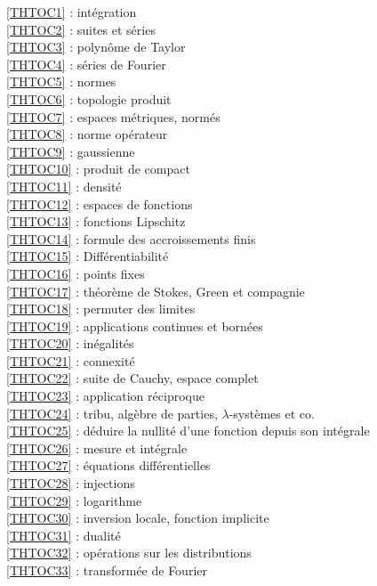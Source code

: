 \ref {THTOC1} : intégration\\
\ref {THTOC2} : suites et séries\\
\ref {THTOC3} : polynôme de Taylor\\
\ref {THTOC4} : séries de Fourier\\
\ref {THTOC5} : normes\\
\ref {THTOC6} : topologie produit\\
\ref {THTOC7} : espaces métriques, normés\\
\ref {THTOC8} : norme opérateur\\
\ref {THTOC9} : gaussienne\\
\ref {THTOC10} : produit de compact\\
\ref {THTOC11} : densité\\
\ref {THTOC12} : espaces de fonctions\\
\ref {THTOC13} : fonctions Lipschitz\\
\ref {THTOC14} : formule des accroissements finis\\
\ref {THTOC15} : Différentiabilité\\
\ref {THTOC16} : points fixes\\
\ref {THTOC17} : théorème de Stokes, Green et compagnie\\
\ref {THTOC18} : permuter des limites\\
\ref {THTOC19} : applications continues et bornées\\
\ref {THTOC20} : inégalités\\
\ref {THTOC21} : connexité\\
\ref {THTOC22} : suite de Cauchy, espace complet\\
\ref {THTOC23} : application réciproque\\
\ref {THTOC24} : tribu, algèbre de parties, \( \lambda \)-systèmes et co.\\
\ref {THTOC25} : déduire la nullité d'une fonction depuis son intégrale\\
\ref {THTOC26} : mesure et intégrale\\
\ref {THTOC27} : équations différentielles\\
\ref {THTOC28} : injections\\
\ref {THTOC29} : logarithme\\
\ref {THTOC30} : inversion locale, fonction implicite\\
\ref {THTOC31} : dualité\\
\ref {THTOC32} : opérations sur les distributions\\
\ref {THTOC33} : transformée de Fourier\\
